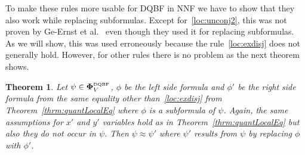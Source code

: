 \documentclass[
  digital, %
  color,
  twoside, %
  table,   %
  nolof,     %
  nolot,     %
]{fithesis3}
\newtheorem{theorem}{Theorem}[chapter] %
\theoremstyle{definition}
\theoremstyle{remark}
\newcommand{\DQBF}[1]{\mathbf{\Phi}_{#1}^{\normalfont{\text{\tiny DQBF}}}}
\begin{document}
To make these rules more usable for DQBF in NNF we have to show that they also work while replacing subformulas. Except for~\eqref{loc:unconj2}, this was not proven by Ge-Ernst et al.~\cite{HQSquantifierLocalisation} even though they used it for replacing subformulas. As we will show, this was used erroneously because the rule~\eqref{loc:exdisj} does not generally hold. However, for other rules there is no problem as the next theorem shows.

\begin{theorem}
  \label{thrm:quantLocalSubformulas}
  Let $\psi \in \DQBF{V}$, $\phi$ be the left side formula and $\phi'$ be the right side formula  from the same equality other than~\eqref{loc:exdisj} from Theorem~\ref{thrm:quantLocalEq} where $\phi$ is a subformula of $\psi$. Again, the same assumptions for $x'$ and $y'$ variables hold as in Theorem~\ref{thrm:quantLocalEq} but also they do not occur in $\psi$. Then $\psi \approx \psi'$ where $\psi'$ results from $\psi$ by replacing $\phi$ with $\phi'$.
\end{theorem}
\end{document}
